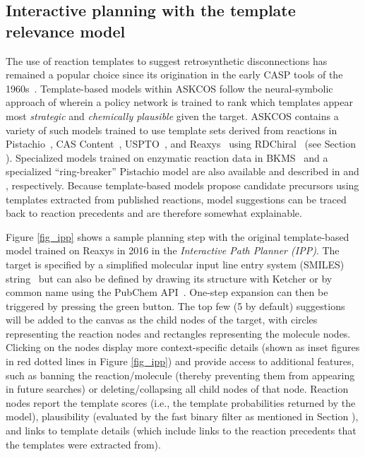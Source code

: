 \documentclass[pdflatex,sn-mathphys-num]{sn-jnl}%
\theoremstyle{thmstyleone}%
\theoremstyle{thmstyletwo}%
\theoremstyle{thmstylethree}%
\begin{document}
\subsection{Interactive planning with the template relevance model}\label{results_ipp_template}


The use of reaction templates to suggest retrosynthetic disconnections has remained a popular choice since its origination in the early CASP tools of the 1960s~\citep{corey_computer-assisted_1969,wipke_simulation_1978,corey_computer-assisted_1972}. Template-based models within ASKCOS follow the neural-symbolic approach of \citet{segler_neural-symbolic_2017} wherein a policy network is trained to rank which templates appear most \emph{strategic} and \emph{chemically plausible} given the target. ASKCOS contains a variety of such models trained to use template sets derived from reactions in Pistachio~\citep{Pistachio}, CAS Content~\citep{CASContent}, USPTO~\citep{lowe_extraction_2012}, and Reaxys~\citep{Reaxys} using RDChiral~\citep{coley_rdchiral_2019} (see Section ). Specialized models trained on enzymatic reaction data in BKMS~\citep{BKMS} and a specialized ``ring-breaker'' Pistachio model are also available and described in \citet{levin_merging_2022} and \citet{thakkar_ring_2020}, respectively. Because template-based models propose candidate precursors using templates extracted from published reactions, model suggestions can be traced back to reaction precedents and are therefore somewhat explainable.


Figure \ref{fig_ipp} shows a sample planning step with the original template-based model trained on Reaxys in 2016 in the \emph{Interactive Path Planner (IPP)}. The target is specified by a simplified molecular input line entry system (SMILES) string~\citep{weininger_smiles_1988} but can also be defined by drawing its structure with Ketcher or by common name using the PubChem API~\citep{PubChemAPI}. One-step expansion can then be triggered by pressing the green button. The top few (5 by default) suggestions will be added to the canvas as the child nodes of the target, with circles representing the reaction nodes and rectangles representing the molecule nodes. Clicking on the nodes display more context-specific details (shown as inset figures in red dotted lines in Figure \ref{fig_ipp}) and provide access to additional features, such as banning the reaction/molecule (thereby preventing them from appearing in future searches) or deleting/collapsing all child nodes of that node. Reaction nodes report the template scores (i.e., the template probabilities returned by the model), plausibility (evaluated by the fast binary filter as mentioned in Section ), and links to template details (which include links to the reaction precedents that the templates were extracted from). 
\end{document}
